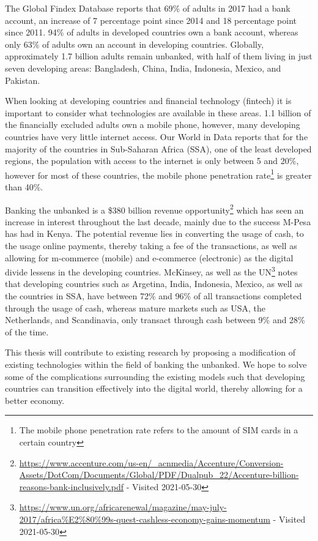 \documentclass[11pt, a4paper]{article}
\begin{document}
The Global Findex Database reports that 69\% of adults in 2017 had a bank account\cite{gfindex}, an increase of 7 percentage point since 2014 and 18 percentage point since 2011\cite{gfindex}. 94\% of adults in developed countries own a bank account, whereas only 63\% of adults own an account in developing countries\cite{gfindex}. Globally, approximately 1.7 billion adults remain unbanked, with half of them living in just seven developing areas: Bangladesh, China, India, Indonesia, Mexico, and Pakistan.

When looking at developing countries and financial technology (fintech) it is important to consider what technologies are available in these areas. 1.1 billion of the financially excluded adults own a mobile phone\cite{gfindex}, however, many developing countries have very little internet access. Our World in Data reports that for the majority of the countries in Sub-Saharan Africa (SSA), one of the least developed regions, the population with access to the internet is only between 5 and 20\%\cite{owidinternet}, however for most of these countries, the mobile phone penetration rate\footnote{The mobile phone penetration rate refers to the amount of SIM cards in a certain country} is greater than 40\%\cite{owidinternet}.

Banking the unbanked is a \$380 billion revenue opportunity\footnote{\url{https://www.accenture.com/us-en/\_acnmedia/Accenture/Conversion-Assets/DotCom/Documents/Global/PDF/Dualpub\_22/Accenture-billion-reasons-bank-inclusively.pdf} - Visited 2021-05-30} which has seen an increase in interest throughout the last decade, mainly due to the success M-Pesa has had in Kenya. The potential revenue lies in converting the usage of cash, to the usage online payments, thereby taking a fee of the transactions, as well as allowing for m-commerce (mobile) and e-commerce (electronic) as the digital divide lessens in the developing countries. McKinsey\cite{mckinsey}, as well as the UN\footnote{\url{https://www.un.org/africarenewal/magazine/may-july-2017/africa\%E2\%80\%99s-quest-cashless-economy-gains-momentum} - Visited 2021-05-30} notes that developing countries such as Argetina, India, Indonesia, Mexico, as well as the countries in SSA, have between 72\% and 96\% of all transactions completed through the usage of cash, whereas mature markets such as USA, the Netherlands, and Scandinavia, only transact through cash between 9\% and 28\% of the time.

This thesis will contribute to existing research by proposing a modification of existing technologies within the field of banking the unbanked. We hope to solve some of the complications surrounding the existing models such that developing countries can transition effectively into the digital world, thereby allowing for a better economy.
\end{document}
